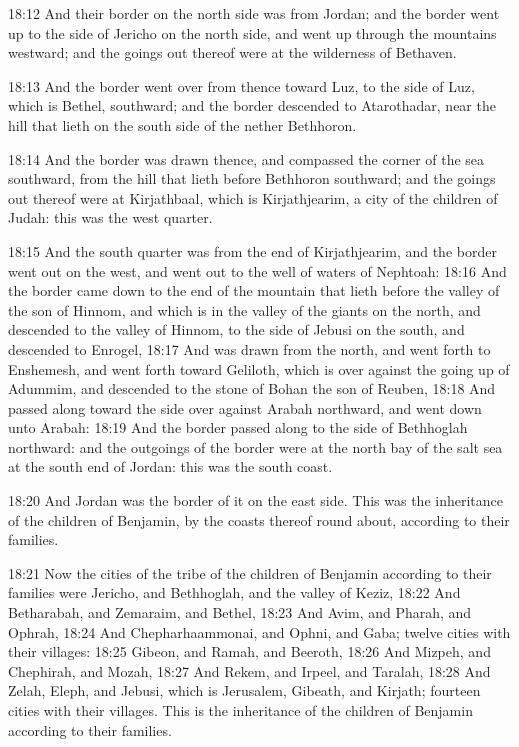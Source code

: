 18:12 And their border on the north side was from Jordan; and the
border went up to the side of Jericho on the north side, and went up
through the mountains westward; and the goings out thereof were at the
wilderness of Bethaven.

18:13 And the border went over from thence toward Luz, to the side of
Luz, which is Bethel, southward; and the border descended to
Atarothadar, near the hill that lieth on the south side of the nether
Bethhoron.

18:14 And the border was drawn thence, and compassed the corner of the
sea southward, from the hill that lieth before Bethhoron southward;
and the goings out thereof were at Kirjathbaal, which is
Kirjathjearim, a city of the children of Judah: this was the west
quarter.

18:15 And the south quarter was from the end of Kirjathjearim, and the
border went out on the west, and went out to the well of waters of
Nephtoah: 18:16 And the border came down to the end of the mountain
that lieth before the valley of the son of Hinnom, and which is in the
valley of the giants on the north, and descended to the valley of
Hinnom, to the side of Jebusi on the south, and descended to Enrogel,
18:17 And was drawn from the north, and went forth to Enshemesh, and
went forth toward Geliloth, which is over against the going up of
Adummim, and descended to the stone of Bohan the son of Reuben, 18:18
And passed along toward the side over against Arabah northward, and
went down unto Arabah: 18:19 And the border passed along to the side
of Bethhoglah northward: and the outgoings of the border were at the
north bay of the salt sea at the south end of Jordan: this was the
south coast.

18:20 And Jordan was the border of it on the east side. This was the
inheritance of the children of Benjamin, by the coasts thereof round
about, according to their families.

18:21 Now the cities of the tribe of the children of Benjamin
according to their families were Jericho, and Bethhoglah, and the
valley of Keziz, 18:22 And Betharabah, and Zemaraim, and Bethel, 18:23
And Avim, and Pharah, and Ophrah, 18:24 And Chepharhaammonai, and
Ophni, and Gaba; twelve cities with their villages: 18:25 Gibeon, and
Ramah, and Beeroth, 18:26 And Mizpeh, and Chephirah, and Mozah, 18:27
And Rekem, and Irpeel, and Taralah, 18:28 And Zelah, Eleph, and
Jebusi, which is Jerusalem, Gibeath, and Kirjath; fourteen cities with
their villages. This is the inheritance of the children of Benjamin
according to their families.

